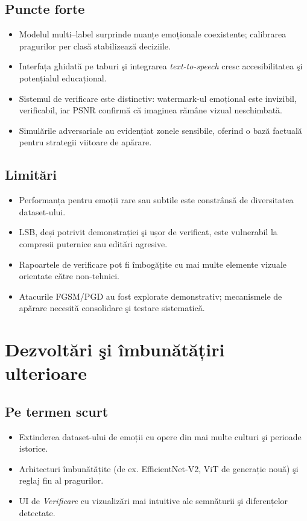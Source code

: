 \subsection*{Puncte forte}
\begin{itemize}
  \item Modelul multi--label surprinde nuanțe emoționale coexistente; calibrarea pragurilor per clasă stabilizează deciziile.
  \item Interfața ghidată pe taburi şi integrarea \emph{text-to-speech} cresc accesibilitatea şi potențialul educațional.
  \item Sistemul de verificare este distinctiv: watermark-ul emoțional este invizibil, verificabil, iar PSNR confirmă că imaginea rămâne vizual neschimbată.
  \item Simulările adversariale au evidențiat zonele sensibile, oferind o bază factuală pentru strategii viitoare de apărare.
\end{itemize}

\subsection*{Limitări}
\begin{itemize}
  \item Performanța pentru emoții rare sau subtile este constrânsă de diversitatea dataset-ului.
  \item LSB, deși potrivit demonstrației şi ușor de verificat, este vulnerabil la compresii puternice sau editări agresive.
  \item Rapoartele de verificare pot fi îmbogățite cu mai multe elemente vizuale orientate către non-tehnici.
  \item Atacurile FGSM/PGD au fost explorate demonstrativ; mecanismele de apărare necesită consolidare şi testare sistematică.
\end{itemize}

\section{Dezvoltări şi îmbunătățiri ulterioare}
\subsection*{Pe termen scurt}
\begin{itemize}
  \item Extinderea dataset-ului de emoții cu opere din mai multe culturi şi perioade istorice.
  \item Arhitecturi îmbunătățite (de ex. EfficientNet-V2, ViT de generație nouă) şi reglaj fin al pragurilor.
  \item UI de \emph{Verificare} cu vizualizări mai intuitive ale semnăturii şi diferențelor detectate.
\end{itemize}

